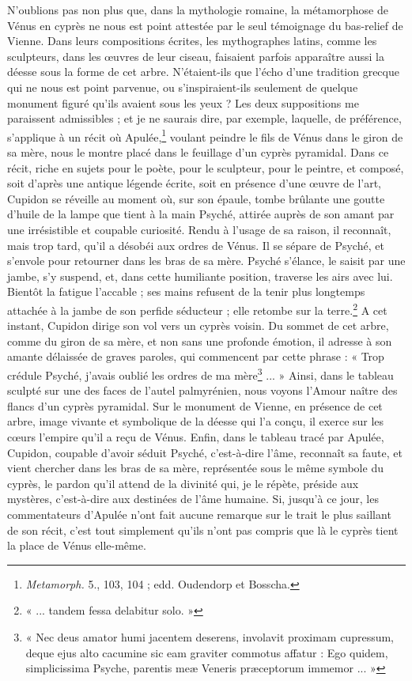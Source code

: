 \documentclass{article}
\begin{document}
N'oublions pas non plus que, dans la mythologie romaine, la métamorphose de Vénus en cyprès ne nous est point attestée par le seul témoignage du bas-relief de Vienne. Dans leurs compositions écrites, les mythographes latins, comme les sculpteurs, dans les œuvres de leur ciseau, faisaient parfois apparaître aussi la déesse sous la forme de cet arbre. N'étaient-ils que l'écho d'une tradition grecque qui ne nous est point parvenue, ou s'inspiraient-ils seulement de quelque monument figuré qu'ils avaient sous les yeux ? Les deux suppositions me paraissent admissibles ; et je ne saurais dire, par exemple, laquelle, de préférence, s'applique à un récit où Apulée,\footnote{\emph{Metamorph.} 5., 103, 104 ; edd. Oudendorp et Bosscha.} voulant peindre le fils de Vénus dans le giron de sa mère, nous le montre placé dans le feuillage d'un cyprès pyramidal. Dans ce récit, riche en sujets pour le poète, pour le sculpteur, pour le peintre, et composé, soit d'après une antique légende écrite, soit en présence d'une œuvre de l'art, Cupidon se réveille au moment où, sur son épaule, tombe brûlante une goutte d'huile de la lampe que tient à la main Psyché, attirée auprès de son amant par une irrésistible et coupable curiosité. Rendu à l'usage de sa raison, il reconnaît, mais trop tard, qu'il a désobéi aux ordres de Vénus. Il se sépare de Psyché, et s'envole pour retourner dans les bras de sa mère. Psyché s'élance, le saisit par une jambe, s'y suspend, et, dans cette humiliante position, traverse les airs avec lui. Bientôt la fatigue l'accable ; ses mains refusent de la tenir plus longtemps attachée à la jambe de son perfide séducteur ; elle retombe sur la terre.\footnote{« ... tandem fessa delabitur solo. »} A cet instant, Cupidon dirige son vol vers un cyprès voisin. Du sommet de cet arbre, comme du giron de sa mère, et non sans une profonde émotion, il adresse à son amante délaissée de graves paroles, qui commencent par cette phrase : « Trop crédule Psyché, j'avais oublié les ordres de ma mère\footnote{« Nec deus amator humi jacentem deserens, involavit proximam cupressum, deque ejus alto cacumine sic eam graviter commotus affatur : Ego quidem, simplicissima Psyche, parentis meæ Veneris præceptorum immemor ... »} ... » Ainsi, dans le tableau sculpté sur une des faces de l'autel palmyrénien, nous voyons l'Amour naître des flancs d'un cyprès pyramidal. Sur le monument de Vienne, en présence de cet arbre, image vivante et symbolique de la déesse qui l'a conçu, il exerce sur les cœurs l'empire qu'il a reçu de Vénus. Enfin, dans le tableau tracé par Apulée, Cupidon, coupable d'avoir séduit Psyché, c'est-à-dire l'âme, reconnaît sa faute, et vient chercher dans les bras de sa mère, représentée sous le même symbole du cyprès, le pardon qu'il attend de la divinité qui, je le répète, préside aux mystères, c'est-à-dire aux destinées de l'âme humaine. Si, jusqu'à ce jour, les commentateurs d'Apulée n'ont fait aucune remarque sur le trait le plus saillant de son récit, c'est tout simplement qu'ils n'ont pas compris que là le cyprès tient la place de Vénus elle-même.
\end{document}
